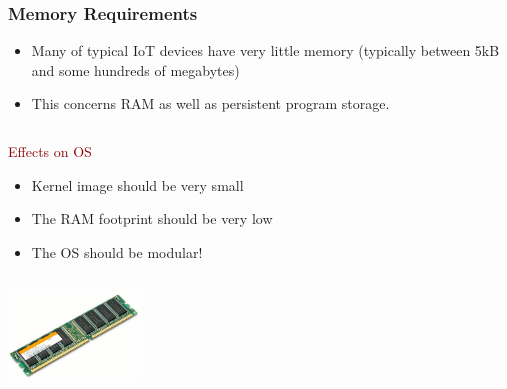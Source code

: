 \documentclass{beamer}
\begin{document}
\begin{frame}
	\frametitle{Memory Requirements}
	\begin{itemize}
		\justifying
		\item Many of typical IoT devices have very little memory (typically between 5kB and some hundreds of megabytes)
		\item This concerns RAM as well as persistent program storage.
	\end{itemize}

	\begin{columns}
	\begin{block}{\centering\textcolor{darkred}{Effects on OS}}
		\justifying
		\begin{itemize}
			\item Kernel image should be very small
			\item The RAM footprint should be very low
			\item The OS should be modular!
		\end{itemize}
	\end{block}
	\end{columns}

	\vspace{0.5cm}
	\hspace*{7cm} \includegraphics[width=3.5cm]{figs/RAM.png}
\end{frame}
\end{document}
